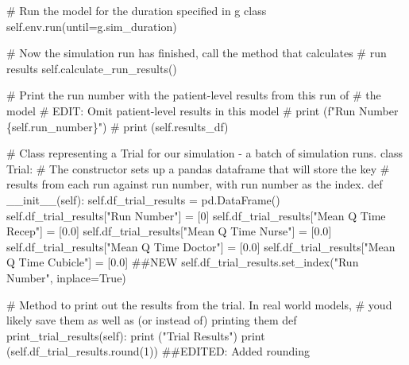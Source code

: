 \documentclass[
  letterpaper,
  DIV=11,
  numbers=noendperiod]{scrreprt}
\newenvironment{Shaded}{}{}
\newcommand{\BuiltInTok}[1]{\textcolor[rgb]{0.84,0.23,0.29}{#1}}
\newcommand{\CommentTok}[1]{\textcolor[rgb]{0.42,0.45,0.49}{#1}}
\newcommand{\DecValTok}[1]{\textcolor[rgb]{0.00,0.36,0.77}{#1}}
\newcommand{\FloatTok}[1]{\textcolor[rgb]{0.00,0.36,0.77}{#1}}
\newcommand{\FunctionTok}[1]{\textcolor[rgb]{0.44,0.26,0.76}{#1}}
\newcommand{\KeywordTok}[1]{\textcolor[rgb]{0.84,0.23,0.29}{#1}}
\newcommand{\NormalTok}[1]{\textcolor[rgb]{0.14,0.16,0.18}{#1}}
\newcommand{\OperatorTok}[1]{\textcolor[rgb]{0.14,0.16,0.18}{#1}}
\newcommand{\StringTok}[1]{\textcolor[rgb]{0.01,0.18,0.38}{#1}}
\newcommand{\VariableTok}[1]{\textcolor[rgb]{0.89,0.38,0.04}{#1}}
\begin{document}
\begin{tcolorbox}
\begin{Shaded}
\begin{Highlighting}[]
        \CommentTok{\# Run the model for the duration specified in g class}
        \VariableTok{self}\NormalTok{.env.run(until}\OperatorTok{=}\NormalTok{g.sim\_duration)}

        \CommentTok{\# Now the simulation run has finished, call the method that calculates}
        \CommentTok{\# run results}
        \VariableTok{self}\NormalTok{.calculate\_run\_results()}

        \CommentTok{\# Print the run number with the patient{-}level results from this run of}
        \CommentTok{\# the model}
        \CommentTok{\# EDIT: Omit patient{-}level results in this model}
        \CommentTok{\# print (f"Run Number \{self.run\_number\}")}
        \CommentTok{\# print (self.results\_df)}

\CommentTok{\# Class representing a Trial for our simulation {-} a batch of simulation runs.}
\KeywordTok{class}\NormalTok{ Trial:}
    \CommentTok{\# The constructor sets up a pandas dataframe that will store the key}
    \CommentTok{\# results from each run against run number, with run number as the index.}
    \KeywordTok{def}  \FunctionTok{\_\_init\_\_}\NormalTok{(}\VariableTok{self}\NormalTok{):}
        \VariableTok{self}\NormalTok{.df\_trial\_results }\OperatorTok{=}\NormalTok{ pd.DataFrame()}
        \VariableTok{self}\NormalTok{.df\_trial\_results[}\StringTok{"Run Number"}\NormalTok{] }\OperatorTok{=}\NormalTok{ [}\DecValTok{0}\NormalTok{]}
        \VariableTok{self}\NormalTok{.df\_trial\_results[}\StringTok{"Mean Q Time Recep"}\NormalTok{] }\OperatorTok{=}\NormalTok{ [}\FloatTok{0.0}\NormalTok{]}
        \VariableTok{self}\NormalTok{.df\_trial\_results[}\StringTok{"Mean Q Time Nurse"}\NormalTok{] }\OperatorTok{=}\NormalTok{ [}\FloatTok{0.0}\NormalTok{]}
        \VariableTok{self}\NormalTok{.df\_trial\_results[}\StringTok{"Mean Q Time Doctor"}\NormalTok{] }\OperatorTok{=}\NormalTok{ [}\FloatTok{0.0}\NormalTok{]}
        \VariableTok{self}\NormalTok{.df\_trial\_results[}\StringTok{"Mean Q Time Cubicle"}\NormalTok{] }\OperatorTok{=}\NormalTok{ [}\FloatTok{0.0}\NormalTok{] }\CommentTok{\#\#NEW}
        \VariableTok{self}\NormalTok{.df\_trial\_results.set\_index(}\StringTok{"Run Number"}\NormalTok{, inplace}\OperatorTok{=}\VariableTok{True}\NormalTok{)}

    \CommentTok{\# Method to print out the results from the trial.  In real world models,}
    \CommentTok{\# you\textquotesingle{}d likely save them as well as (or instead of) printing them}
    \KeywordTok{def}\NormalTok{ print\_trial\_results(}\VariableTok{self}\NormalTok{):}
        \BuiltInTok{print}\NormalTok{ (}\StringTok{"Trial Results"}\NormalTok{)}
        \BuiltInTok{print}\NormalTok{ (}\VariableTok{self}\NormalTok{.df\_trial\_results.}\BuiltInTok{round}\NormalTok{(}\DecValTok{1}\NormalTok{)) }\CommentTok{\#\#EDITED: Added rounding}


\end{Highlighting}
\end{Shaded}
\end{tcolorbox}
\end{document}
